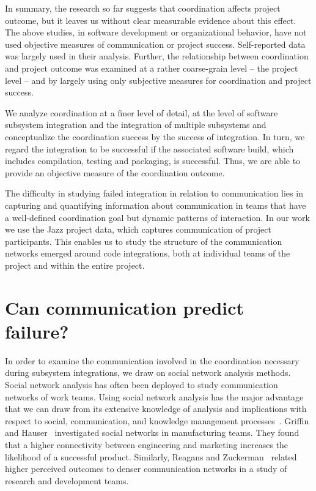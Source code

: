 \documentclass[12pt,oneside]{book}
\begin{document}
In summary, the research so far suggests that coordination affects project
outcome, but it leaves us without clear measurable evidence about this effect.
The above studies, in software development or organizational behavior, have not
used objective measures of communication or project success. Self-reported data
was largely used in their analysis. Further, the relationship between
coordination and project outcome was examined at a rather coarse-grain level --
the project level -- and by largely using only subjective measures for
coordination and project success.

We analyze coordination at a finer level of detail, at the level of software
subsystem integration and the integration of multiple subsystems and
conceptualize the coordination success by the success of integration. In turn, we
regard the integration to be successful if the associated software build, which
includes compilation, testing and packaging, is successful. Thus, we are able to
provide an objective measure of the coordination outcome.


The difficulty in studying failed integration in relation to communication lies
in capturing and quantifying information about communication in teams that have a
well-defined coordination goal but dynamic patterns of interaction. In our work
we use the Jazz project data, which captures communication of project
participants. This enables us to study the structure of the communication
networks emerged around code integrations, both at individual teams of the
project and within the entire project.



\section{Can communication predict failure?}
\label{sec:ResearchQuestions}
In order to examine the communication involved in the coordination necessary
during subsystem integrations, we draw on social network analysis methods. Social
network analysis has often been deployed to study communication networks of work
teams. Using social network analysis has the major advantage that we can draw
from its extensive knowledge of analysis and implications with respect to social,
communication, and knowledge management
processes~\cite{Burt:1995vo,Freeman:1979rl}. Griffin and
Hauser~\cite{Griffin:1992ms} investigated social networks in manufacturing teams.
They found that a higher connectivity between engineering and marketing increases
the likelihood of a successful product. Similarly, Reagans and
Zuckerman~\cite{RayReagans:2001os} related higher perceived outcomes to denser
communication networks in a study of research and development teams.
\end{document}
